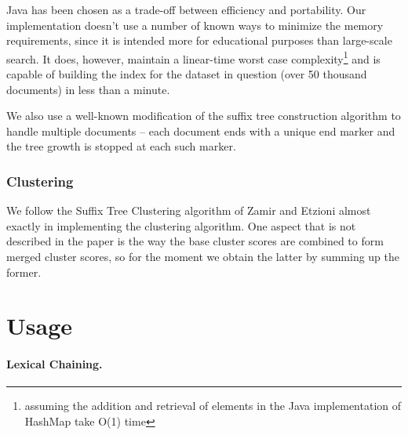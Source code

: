 \documentclass[11pt, a4paper, abstraction]{scrartcl}
\begin{document}
Java has been chosen as a trade-off between efficiency and portability. Our implementation doesn't use a number of known ways to minimize the memory requirements, since it is intended more for educational purposes than large-scale search. It does, however, maintain a linear-time worst case complexity\footnote{assuming the addition and retrieval of elements in the Java implementation of HashMap take O(1) time} and is capable of building the index for the dataset in question (over 50 thousand documents) in less than a minute.

We also use a well-known modification of the suffix tree construction algorithm to handle multiple documents -- each document ends with a unique end marker and the tree growth is stopped at each such marker.

\subsubsection{Clustering}
We follow the Suffix Tree Clustering algorithm of Zamir and Etzioni almost exactly in implementing the clustering algorithm. One aspect that is not described in the paper is the way the base cluster scores are combined to form merged cluster scores, so for the moment we obtain the latter by summing up the former.
 

\section{Usage}
\label{sec:usage}


\paragraph{Lexical Chaining.} 

% 
% 
% 
% 
% 
% 
\end{document}
